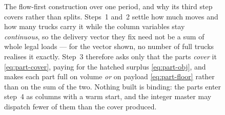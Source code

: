 \begin{figure}[!htb]
{}
\caption{The flow-first construction over one period, and why its third
step covers rather than splits. Steps~1 and~2 settle how much moves and
how many trucks carry it while the column variables stay
\emph{continuous}, so the delivery vector they fix need not be a sum of
whole legal loads --- for the vector shown, no number of full trucks
realises it exactly. Step~3 therefore asks only that the parts
\emph{cover} it \eqref{eq:part-cover}, paying for the hatched surplus
\eqref{eq:part-obj}, and makes each part full on volume \emph{or} on
payload \eqref{eq:part-floor} rather than on the sum of the two. Nothing
built is binding: the parts enter step~4 as columns with a warm start,
and the integer master may dispatch fewer of them than the cover
produced.}
\label{fig:construct}
\end{figure}
